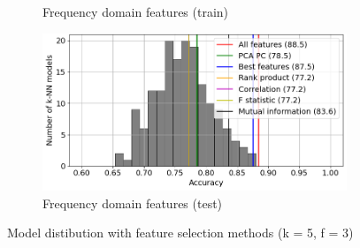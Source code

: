\begin{figure}[h]
\begin{subfigure}[b]{0.48\textwidth}
        \caption{Frequency domain features (train)}
    \end{subfigure}
    \hfill
    \begin{subfigure}[b]{0.48\textwidth}
        \includegraphics[width=\textwidth]{assets/results/feature-combinations/model-distr-fsel-k5-f3-FD-test.png}
        \caption{Frequency domain features (test)}
    \end{subfigure}
    \caption{Model distibution with feature selection methods (k = 5, f = 3)}
\end{figure}





